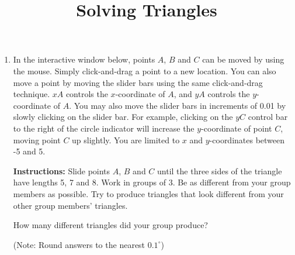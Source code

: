 \documentclass[number]{ximera}
\title{Solving Triangles}
\begin{document}
\begin{abstract}
\end{abstract}
\maketitle

\begin{enumerate}

\item In the interactive window below, points $A$, $B$ and $C$ can be moved by using the mouse. Simply click-and-drag a point to a new location. You can also move a point by moving the slider bars using the same click-and-drag technique. $xA$ controls the $x$-coordinate of $A$, and $yA$ controls the $y$-coordinate of $A$. You may also move the slider bars in increments of 0.01 by slowly clicking on the slider bar. For example, clicking on the $yC$ control bar to the right of the circle indicator will increase the $y$-coordinate of point $C$, moving point $C$ up slightly. You are limited to $x$ and $y$-coordinates between -5 and 5. 

{\bf {Instructions:}} Slide points $A$, $B$ and $C$ until the three sides of the triangle have lengths 5, 7 and 8. Work in groups of 3. Be as different from your group members as possible. Try to produce triangles that look different from your other group members' triangles.



\begin{question}
How many different triangles did your group produce?
\begin{multipleChoice}
\end{multipleChoice}
\begin{question}
(Note: Round answers to the nearest $0.1^\circ$)


\end{question}
\end{question}
\end{enumerate}
\end{document}
